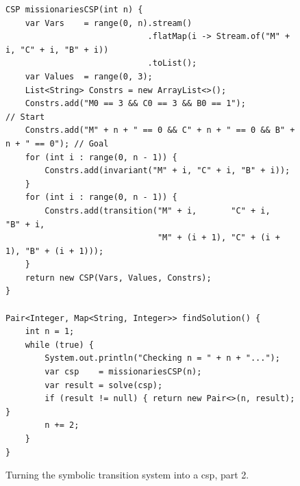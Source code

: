 \begin{figure}[!ht]
\centering
\begin{verbatim}
CSP missionariesCSP(int n) {
    var Vars    = range(0, n).stream()
                             .flatMap(i -> Stream.of("M" + i, "C" + i, "B" + i))
                             .toList();
    var Values  = range(0, 3);
    List<String> Constrs = new ArrayList<>();
    Constrs.add("M0 == 3 && C0 == 3 && B0 == 1");                         // Start
    Constrs.add("M" + n + " == 0 && C" + n + " == 0 && B" + n + " == 0"); // Goal
    for (int i : range(0, n - 1)) {
        Constrs.add(invariant("M" + i, "C" + i, "B" + i));
    }
    for (int i : range(0, n - 1)) {
        Constrs.add(transition("M" + i,       "C" + i,       "B" + i,
                               "M" + (i + 1), "C" + (i + 1), "B" + (i + 1)));
    }
    return new CSP(Vars, Values, Constrs);
}

Pair<Integer, Map<String, Integer>> findSolution() {
    int n = 1;
    while (true) {
        System.out.println("Checking n = " + n + "...");
        var csp    = missionariesCSP(n);
        var result = solve(csp);
        if (result != null) { return new Pair<>(n, result); }
        n += 2;
    }
}
\end{verbatim}
\vspace*{-0.3cm}
\caption{Turning the symbolic transition system into a \Gls{csp}, part 2.}
\label{fig:Missionaries-STS.ipynb-2}
\end{figure} %

